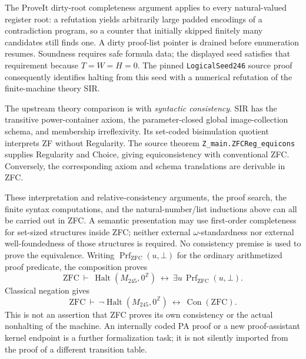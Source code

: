 \documentclass[11pt]{article}
\newcommand{\halt}{\operatorname{Halt}}
\newcommand{\Con}{\operatorname{Con}}
\begin{document}
The ProveIt dirty-root completeness argument applies to every natural-valued
register root: a refutation yields arbitrarily large padded encodings of a
contradiction program, so a counter that initially skipped finitely many
candidates still finds one. A dirty proof-list pointer is drained before
enumeration resumes. Soundness requires safe formula data; the displayed
seed satisfies that requirement because $T=W=H=0$. The pinned
\texttt{LogicalSeed246} source proof consequently identifies halting from
this seed with a numerical refutation of the finite-machine theory SIR.

The upstream theory comparison is with \emph{syntactic consistency}.
SIR has the transitive power-container axiom, the parameter-closed global
image-collection schema, and membership irreflexivity. Its set-coded
bisimulation quotient interprets ZF without Regularity. The source theorem
\texttt{Z\_main.ZFCReg\_equicons} supplies Regularity and Choice, giving
equiconsistency with conventional ZFC. Conversely, the corresponding
axiom and schema translations are derivable in ZFC.

These interpretation and relative-consistency arguments, the proof search,
the finite syntax computations, and the natural-number/list inductions above
can all be carried out in ZFC. A semantic presentation may use first-order
completeness for set-sized structures inside ZFC; neither external
$\omega$-standardness nor external well-foundedness of those structures is
required. No consistency premise is used to prove the equivalence.
Writing $\operatorname{Prf}_{\mathrm{ZFC}}(u,\bot)$ for the ordinary
arithmetized proof predicate, the composition proves
\[
 \mathrm{ZFC}\ \vdash\
 \halt(M_{245},0^\mathbb Z)
 \ \longleftrightarrow\
 \exists u\,\operatorname{Prf}_{\mathrm{ZFC}}(u,\bot).
\]
Classical negation gives
\[
 \boxed{\mathrm{ZFC}\ \vdash\
 \neg\halt(M_{245},0^\mathbb Z)
 \ \longleftrightarrow\ \Con(\mathrm{ZFC}).}
\]
This is not an assertion that ZFC proves its own consistency or the actual
nonhalting of the machine. An internally coded PA proof or a new
proof-assistant kernel endpoint is a further formalization task; it is not
silently imported from the proof of a different transition table.
\end{document}
